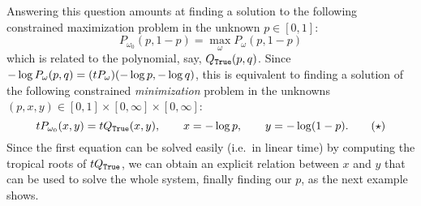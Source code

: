 Answering this question amounts at finding a solution to the following constrained maximization problem in the unknown $p\in[0,1]$:
%
%
%
%
\[
P_{\omega_0}(p,1-p) = \max_\omega P_{\omega}(p,1-p)
\]
which is related to the polynomial, say, $Q_{\mathtt{True}}(p,q)$.
Since $-\log P_\omega(p,q)=(\trop P_{\omega})(-\log p,-\log q)$, this is equivalent
 to finding a solution of the following constrained \emph{minimization} problem in the unknowns $(p,x,y)\in[0,1]\times[0,\infty]\times[0,\infty]$:
\begin{equation}\label{eq:troproot}
\trop P_{\omega_{0}} (x,y)= \trop Q_{\true}(x,y) , \qquad x= -\log p,\qquad y=-\log(1-p).
\tag{$\star$}
\end{equation}
Since the first equation can be solved easily (i.e.~in linear time) by computing the tropical roots of $\trop Q_{\true}$, we can obtain an explicit relation between $x$ and $y$ that can be used to solve the whole system, finally finding our $p$, as the next example shows.
